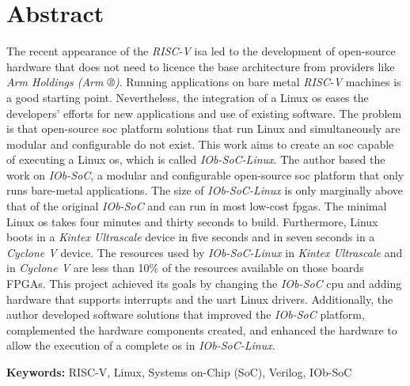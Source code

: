 \cleardoubleoddpage

\chapter*{Abstract}
The recent appearance of the \textit{RISC-V} \acrshort{isa} led to the development of open-source hardware that does not need to licence the base architecture from providers like \textit{Arm Holdings (Arm ®)}. Running applications on bare metal \textit{RISC-V} machines is a good starting point. Nevertheless, the integration of a Linux \acrshort{os} eases the developers' efforts for new applications and use of existing software. The problem is that open-source \acrshort{soc} platform solutions that run Linux and simultaneously are modular and configurable do not exist. 
This work aims to create an \acrshort{soc} capable of executing a Linux \acrshort{os}, which is called \textit{IOb-SoC-Linux}. The author based the work on \textit{IOb-SoC}, a modular and configurable open-source \acrshort{soc} platform that only runs bare-metal applications. The size of \textit{IOb-SoC-Linux} is only marginally above that of the original \textit{IOb-SoC} and can run in most low-cost \acrshort{fpga}s. The minimal Linux \acrshort{os} takes four minutes and thirty seconds to build. Furthermore, Linux boots in a \textit{Kintex Ultrascale} device in five seconds and in seven seconds in a \textit{Cyclone V} device. The resources used by \textit{IOb-SoC-Linux} in \textit{Kintex Ultrascale} and in \textit{Cyclone V} are less than 10\% of the resources available on those boards FPGAs.
This project achieved its goals by changing the \textit{IOb-SoC} \acrshort{cpu} and adding hardware that supports interrupts and the \acrshort{uart} Linux drivers. Additionally, the author developed software solutions that improved the \textit{IOb-SoC} platform, complemented the hardware components created, and enhanced the hardware to allow the execution of a complete \acrshort{os} in \textit{IOb-SoC-Linux}. 

\vfill

\textbf{\Large Keywords:} RISC-V, Linux, Systems on-Chip (SoC), Verilog, IOb-SoC